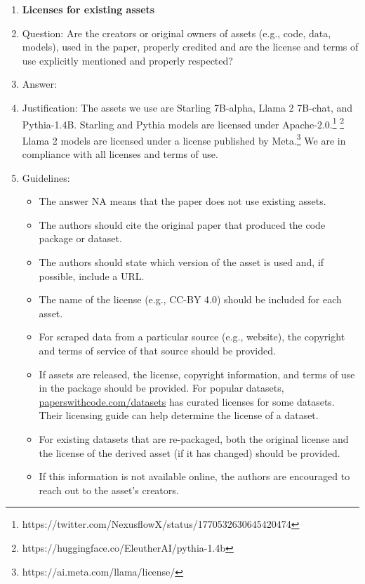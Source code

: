 \documentclass{article}
\begin{document}
\begin{enumerate}
\item {\bf Licenses for existing assets}
    \item[] Question: Are the creators or original owners of assets (e.g., code, data, models), used in the paper, properly credited and are the license and terms of use explicitly mentioned and properly respected?
    \item[] Answer: \answerYes{} %
    \item[] Justification: The assets we use are Starling 7B-alpha, Llama 2 7B-chat, and Pythia-1.4B. Starling and Pythia models are licensed under Apache-2.0.\footnote{https://twitter.com/NexusflowX/status/1770532630645420474} \footnote{https://huggingface.co/EleutherAI/pythia-1.4b} Llama 2 models are licensed under a license published by Meta.\footnote{https://ai.meta.com/llama/license/} We are in compliance with all licenses and terms of use.
    \item[] Guidelines:
    \begin{itemize}
        \item The answer NA means that the paper does not use existing assets.
        \item The authors should cite the original paper that produced the code package or dataset.
        \item The authors should state which version of the asset is used and, if possible, include a URL.
        \item The name of the license (e.g., CC-BY 4.0) should be included for each asset.
        \item For scraped data from a particular source (e.g., website), the copyright and terms of service of that source should be provided.
        \item If assets are released, the license, copyright information, and terms of use in the package should be provided. For popular datasets, \url{paperswithcode.com/datasets} has curated licenses for some datasets. Their licensing guide can help determine the license of a dataset.
        \item For existing datasets that are re-packaged, both the original license and the license of the derived asset (if it has changed) should be provided.
        \item If this information is not available online, the authors are encouraged to reach out to the asset's creators.
    \end{itemize}


\end{enumerate}
\end{document}
